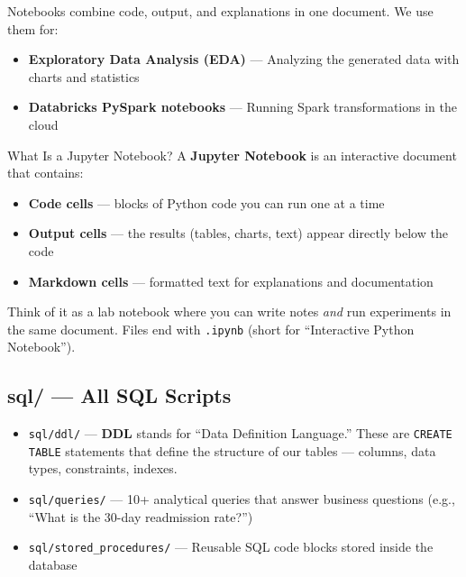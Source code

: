 \documentclass[12pt, a4paper, oneside]{report}
\begin{document}
Notebooks combine code, output, and explanations in one document. We use them for:
\begin{itemize}
    \item \textbf{Exploratory Data Analysis (EDA)} --- Analyzing the generated data with charts and statistics
    \item \textbf{Databricks PySpark notebooks} --- Running Spark transformations in the cloud
\end{itemize}

\begin{conceptbox}{What Is a Jupyter Notebook?}
A \textbf{Jupyter Notebook} is an interactive document that contains:
\begin{itemize}
    \item \textbf{Code cells} --- blocks of Python code you can run one at a time
    \item \textbf{Output cells} --- the results (tables, charts, text) appear directly below the code
    \item \textbf{Markdown cells} --- formatted text for explanations and documentation
\end{itemize}
Think of it as a lab notebook where you can write notes \textit{and} run experiments in the same document. Files end with \texttt{.ipynb} (short for ``Interactive Python Notebook'').
\end{conceptbox}

\subsection{sql/ --- All SQL Scripts}

\begin{itemize}
    \item \texttt{sql/ddl/} --- \textbf{DDL} stands for ``Data Definition Language.'' These are \texttt{CREATE TABLE} statements that define the structure of our tables --- columns, data types, constraints, indexes.
    \item \texttt{sql/queries/} --- 10+ analytical queries that answer business questions (e.g., ``What is the 30-day readmission rate?'')
    \item \texttt{sql/stored\_procedures/} --- Reusable SQL code blocks stored inside the database
\end{itemize}
\end{document}
